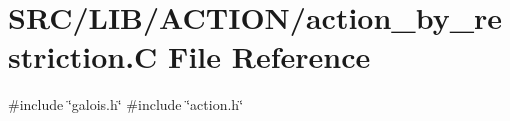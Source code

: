 \hypertarget{action__by__restriction_8_c}{}\section{S\+R\+C/\+L\+I\+B/\+A\+C\+T\+I\+O\+N/action\+\_\+by\+\_\+restriction.C File Reference}
\label{action__by__restriction_8_c}
{\ttfamily \#include \char`\"{}galois.\+h\char`\"{}}\newline
{\ttfamily \#include \char`\"{}action.\+h\char`\"{}}\newline
